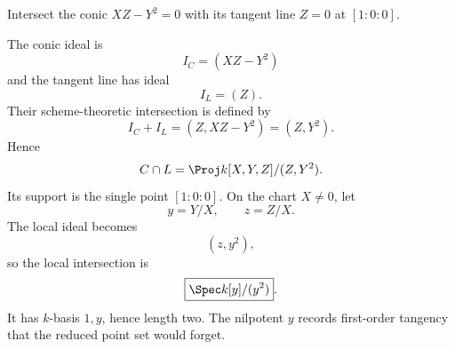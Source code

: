 \begin{problem}\label{prob:vi37-04}
Intersect the conic \(XZ-Y^2=0\) with its tangent line \(Z=0\) at \([1:0:0]\).
\end{problem}

\ifdefined\FullProblemDossiers
\begin{solution}
The conic ideal is
\[
I_C=(XZ-Y^2)
\]
and the tangent line has ideal
\[
I_L=(Z).
\]
Their scheme-theoretic intersection is defined by
\[
I_C+I_L
=
(Z,XZ-Y^2)
=
(Z,Y^2).
\]
Hence
\[
C\cap L
=
\Proj k[X,Y,Z]/(Z,Y^2).
\]
Its support is the single point \([1:0:0]\). On the chart \(X\neq0\), let
\[
y=Y/X,\qquad z=Z/X.
\]
The local ideal becomes
\[
(z,y^2),
\]
so the local intersection is
\[
\boxed{\Spec k[y]/(y^2)}.
\]
It has \(k\)-basis \(1,y\), hence length two. The nilpotent \(y\) records first-order tangency that the reduced point set would forget.
\end{solution}
\fi
